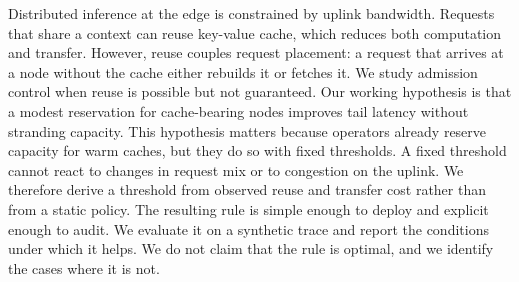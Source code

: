 Distributed inference at the edge is constrained by uplink bandwidth.
Requests that share a context can reuse key-value cache, which reduces both computation and transfer.
However, reuse couples request placement: a request that arrives at a node without the cache either rebuilds it or fetches it.
We study admission control when reuse is possible but not guaranteed.
Our working hypothesis is that a modest reservation for cache-bearing nodes improves tail latency without stranding capacity.
This hypothesis matters because operators already reserve capacity for warm caches, but they do so with fixed thresholds.
A fixed threshold cannot react to changes in request mix or to congestion on the uplink.
We therefore derive a threshold from observed reuse and transfer cost rather than from a static policy.
The resulting rule is simple enough to deploy and explicit enough to audit.
We evaluate it on a synthetic trace and report the conditions under which it helps.
We do not claim that the rule is optimal, and we identify the cases where it is not.

